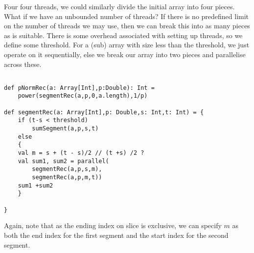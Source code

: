 Four four threads, we could similarly divide the initial array into four pieces. What if we have an unbounded number of threads? If there is no predefined limit on the number of threads we may use, then we can break this into as many pieces as is suitable. There is some overhead associated with setting up threads, so we define some threshold. For a (sub) array with size less than the threshold, we just operate on it sequentially, else we break our array into two pieces and parallelise across these.

\begin{lstlisting}

def pNormRec(a: Array[Int],p:Double): Int = 
    power(segmentRec(a,p,0,a.length),1/p)

def segmentRec(a: Array[Int],p: Double,s: Int,t: Int) = {
    if (t-s < threshold)
        sumSegment(a,p,s,t)
    else
    {
    val m = s + (t - s)/2 // (t +s) /2 ?
    val sum1, sum2 = parallel(
        segmentRec(a,p,s,m),
        segmentRec(a,p,m,t))
    sum1 +sum2
    }

}
\end{lstlisting}
Again, note that as the ending index on slice is exclusive, we can specify $m$ as both the end index for the first segment and the start index for the second segment.




